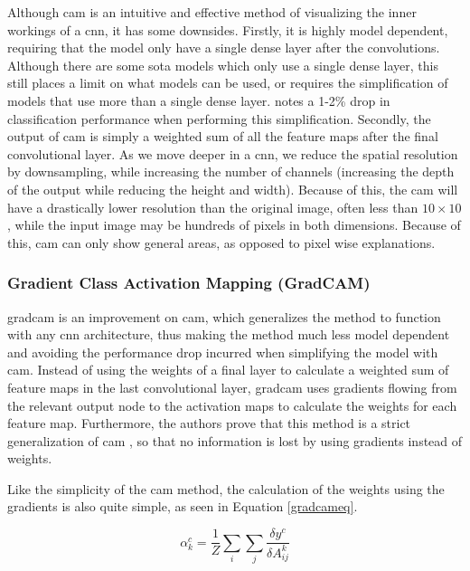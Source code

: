 \documentclass[UKenglish]{uiomasterthesis} %
\theoremstyle{definition}
\begin{document}
Although \ac{cam} is an intuitive and effective method of visualizing the inner workings of a \ac{cnn}, it has some downsides. Firstly, it is highly model dependent, requiring that the model only have a single dense layer after the convolutions. Although there are some \ac{sota} models which only use a single dense layer, this still places a limit on what models can be used, or requires the simplification of models that use more than a single dense layer. \cite[4]{cam} notes a 1-2\% drop in classification performance when performing this simplification. Secondly, the output of \ac{cam} is simply a weighted sum of all the feature maps after the final convolutional layer. As we move deeper in a \ac{cnn}, we reduce the spatial resolution by downsampling, while increasing the number of channels (increasing the depth of the output while reducing the height and width). Because of this, the \ac{cam} will have a drastically lower resolution than the original image, often less than $10 \times 10$, while the input image may be hundreds of pixels in both dimensions. Because of this, \ac{cam} can only show general areas, as opposed to pixel wise explanations.
\\

\subsubsection{Gradient Class Activation Mapping (GradCAM)} \label{section:gradcam}

\ac{gradcam} \cite{gradcam} is an improvement on \ac{cam}, which generalizes the method to function with any \ac{cnn} architecture, thus making the method much less model dependent and avoiding the performance drop incurred when simplifying the model with \ac{cam}. Instead of using the weights of a final layer to calculate a weighted sum of feature maps in the last convolutional layer, \ac{gradcam} uses gradients flowing from the relevant output node to the activation maps to calculate the weights for each feature map. Furthermore, the authors prove that this method is a strict generalization of \ac{cam} \cite[5]{gradcam}, so that no information is lost by using gradients instead of weights.

Like the simplicity of the \ac{cam} method, the calculation of the weights using the gradients is also quite simple, as seen in Equation \ref{gradcameq}.

\begin{equation}
\alpha^c_k = \frac{1}{Z} \sum_i \sum_j \frac{\delta y^c}{\delta A^k_{ij}}
\label{gradcameq}
\end{equation}
\end{document}
